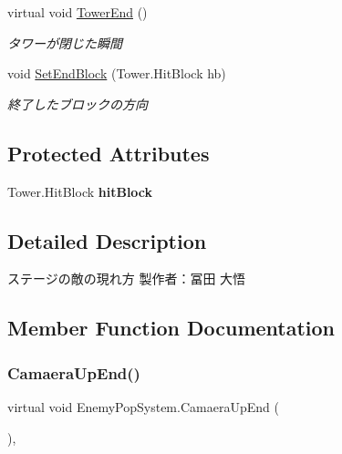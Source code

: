 \begin{DoxyCompactItemize}
virtual void \hyperlink{class_enemy_pop_system_ad19396ecf796350cedde7a996d4b3843}{Tower\+End} ()
\begin{DoxyCompactList}\small\item\em タワーが閉じた瞬間 \end{DoxyCompactList}\item 
void \hyperlink{class_enemy_pop_system_a876d042c43e62e8ad3a7cd96a945f7f7}{Set\+End\+Block} (Tower.\+Hit\+Block hb)
\begin{DoxyCompactList}\small\item\em 終了したブロックの方向 \end{DoxyCompactList}\end{DoxyCompactItemize}
\subsection*{Protected Attributes}
\begin{DoxyCompactItemize}
\item 
\mbox{\label{class_enemy_pop_system_a75bd67147850e787e86dc89f7abeda62}} 
Tower.\+Hit\+Block {\bfseries hit\+Block}
\end{DoxyCompactItemize}


\subsection{Detailed Description}
ステージの敵の現れ方 製作者：冨田 大悟 



\subsection{Member Function Documentation}
\mbox{\label{class_enemy_pop_system_a86c3886d3f4603c9acf3356afadcc72a}} 
\subsubsection{\texorpdfstring{Camaera\+Up\+End()}{CamaeraUpEnd()}}
{\footnotesize\ttfamily virtual void Enemy\+Pop\+System.\+Camaera\+Up\+End (\begin{DoxyParamCaption}{ }\end{DoxyParamCaption})\hspace{0.3cm}{\ttfamily [inline]}, {\ttfamily [virtual]}}



